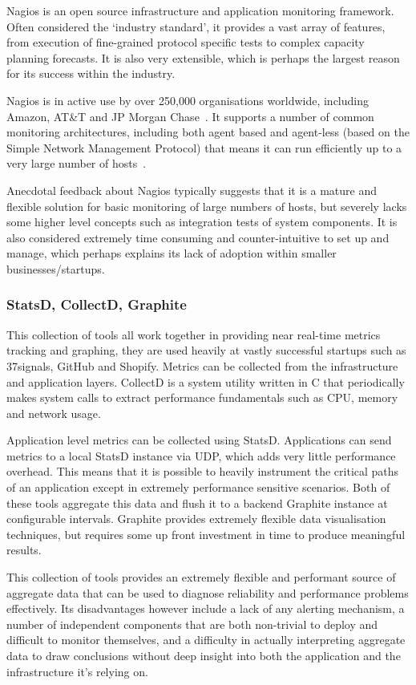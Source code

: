 \documentclass{cshonours}
\begin{document}
Nagios is an open source infrastructure and application monitoring framework. Often considered the `industry standard', it provides a vast array of features, from execution of fine-grained protocol specific tests to complex capacity planning forecasts. It is also very extensible, which is perhaps the largest reason for its success within the industry.

Nagios is in active use by over 250,000 organisations worldwide, including Amazon, AT\&T and JP Morgan Chase~\cite{NagiosUsage}. It supports a number of common monitoring architectures, including both agent based and agent-less (based on the Simple Network Management Protocol) that means it can run efficiently up to a very large number of hosts~\cite{NagiosArchitectures}.

Anecdotal feedback about Nagios typically suggests that it is a mature and flexible solution for basic monitoring of large numbers of hosts, but severely lacks some higher level concepts such as integration tests of system components. It is also considered extremely time consuming and counter-intuitive to set up and manage, which perhaps explains its lack of adoption within smaller businesses/startups.

\subsubsection{StatsD, CollectD, Graphite}

This collection of tools all work together in providing near real-time metrics tracking and graphing, they are used heavily at vastly successful startups such as 37signals, GitHub and Shopify. Metrics can be collected from the infrastructure and application layers. 
CollectD is a system utility written in C that periodically makes system calls to extract performance fundamentals such as CPU, memory and network usage. 

Application level metrics can be collected using StatsD. Applications can send metrics to a local StatsD instance via UDP, which adds very little performance overhead. This means that it is possible to heavily instrument the critical paths of an application except in extremely performance sensitive scenarios. Both of these tools aggregate this data and flush it to a backend Graphite instance at configurable intervals. Graphite provides extremely flexible data visualisation techniques, but requires some up front investment in time to produce meaningful results.

This collection of tools provides an extremely flexible and performant source of aggregate data that can be used to diagnose reliability and performance problems effectively. Its disadvantages however include a lack of any alerting mechanism, a number of independent components that are both non-trivial to deploy and difficult to monitor themselves, and a difficulty in actually interpreting aggregate data to draw conclusions without deep insight into both the application and the infrastructure it’s relying on.
\end{document}
